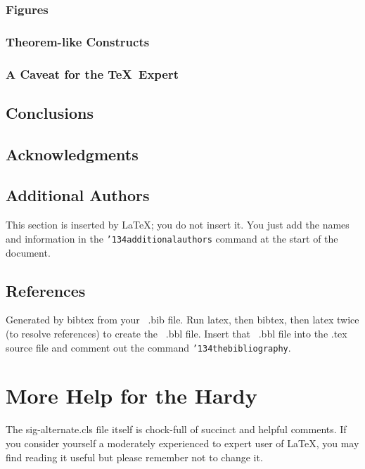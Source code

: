 \documentclass{sig-alternate}
\begin{document}
\subsubsection{Figures}
\subsubsection{Theorem-like Constructs}
\subsubsection*{A Caveat for the \TeX\ Expert}
\subsection{Conclusions}
\subsection{Acknowledgments}
\subsection{Additional Authors}
This section is inserted by \LaTeX; you do not insert it.
You just add the names and information in the
\texttt{{\char'134}additionalauthors} command at the start
of the document.
\subsection{References}
Generated by bibtex from your ~.bib file.  Run latex,
then bibtex, then latex twice (to resolve references)
to create the ~.bbl file.  Insert that ~.bbl file into
the .tex source file and comment out
the command \texttt{{\char'134}thebibliography}.
\section{More Help for the Hardy}
The sig-alternate.cls file itself is chock-full of succinct
and helpful comments.  If you consider yourself a moderately
experienced to expert user of \LaTeX, you may find reading
it useful but please remember not to change it.
\end{document}
